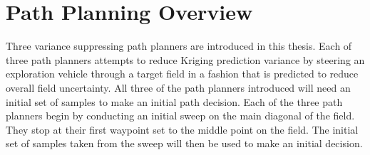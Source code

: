 






\section{Path Planning Overview}
Three variance suppressing path planners are introduced in this thesis. Each of three path planners attempts to reduce Kriging prediction variance by steering an exploration vehicle through a target field in a fashion that is predicted to reduce overall field uncertainty. All three of the path planners introduced will need an initial set of samples to make an initial path decision. Each of the three path planners begin by conducting an initial sweep on the main diagonal of the field. They stop at their first waypoint set to the middle point on the field. The initial set of samples taken from the sweep will then be used to make an initial decision.

